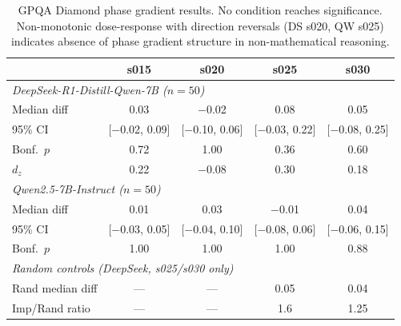 \documentclass[11pt,a4paper]{article}
\begin{document}
\begin{table}[h]
\centering
\small
\begin{tabular}{lcccc}
\toprule
& s015 & s020 & s025 & s030 \\
\midrule
\multicolumn{5}{l}{\textit{DeepSeek-R1-Distill-Qwen-7B ($n = 50$)}} \\
Median diff & 0.03 & $-$0.02 & 0.08 & 0.05 \\
95\% CI & [$-$0.02, 0.09] & [$-$0.10, 0.06] & [$-$0.03, 0.22] & [$-$0.08, 0.25] \\
Bonf.\ $p$ & 0.72 & 1.00 & 0.36 & 0.60 \\
$d_z$ & 0.22 & $-$0.08 & 0.30 & 0.18 \\
\midrule
\multicolumn{5}{l}{\textit{Qwen2.5-7B-Instruct ($n = 50$)}} \\
Median diff & 0.01 & 0.03 & $-$0.01 & 0.04 \\
95\% CI & [$-$0.03, 0.05] & [$-$0.04, 0.10] & [$-$0.08, 0.06] & [$-$0.06, 0.15] \\
Bonf.\ $p$ & 1.00 & 1.00 & 1.00 & 0.88 \\
\midrule
\multicolumn{5}{l}{\textit{Random controls (DeepSeek, s025/s030 only)}} \\
Rand median diff & --- & --- & 0.05 & 0.04 \\
Imp/Rand ratio & --- & --- & 1.6 & 1.25 \\
\bottomrule
\end{tabular}
\caption{GPQA Diamond phase gradient results. No condition reaches significance. Non-monotonic dose-response with direction reversals (DS s020, QW s025) indicates absence of phase gradient structure in non-mathematical reasoning.}
\label{tab:gpqa}
\end{table}
\end{document}
